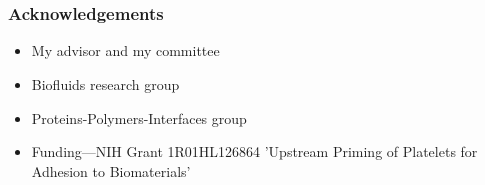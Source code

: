 \documentclass{beamer}
\begin{document}
\section{}
\begin{frame}
  \frametitle{Acknowledgements}
  \begin{itemize}
  \item My advisor and my committee
  \item Biofluids research group
  \item Proteins-Polymers-Interfaces group
  \item Funding---NIH Grant 1R01HL126864 'Upstream Priming of
    Platelets for Adhesion to Biomaterials'
  \end{itemize}
\end{frame}
\end{document}
